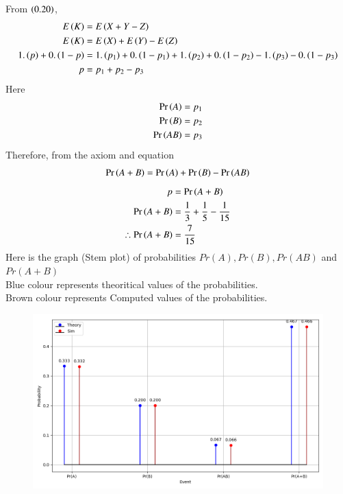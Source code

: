\documentclass[journal]{IEEEtran}
\begin{document}
From $\left(0.20\right)$,
\begin{align}
	E\left(K\right) &= E\left(X + Y - Z\right)\\
	E\left(K\right) &= E\left(X\right) + E\left(Y\right) - E\left(Z\right)\\
	1.\left(p\right) + 0.\left(1 - p\right) &= 1.\left(p_1\right) + 0.\left(1 - p_1\right) + 1.\left(p_2\right) + 0.\left(1 - p_2\right) - 1.\left(p_3\right) - 0.\left(1 - p_3\right)\\
	p &= p_1 + p_2 - p_3
\end{align}
Here
\begin{align}
	\Pr\left(A\right) = p_1\\
	\Pr\left(B\right) = p_2\\
	\Pr\left(AB\right) = p_3
\end{align}
Therefore, from the axiom and equation \\
\begin{align}
	\Pr\left(A + B\right) = \Pr\left(A\right) + \Pr\left(B\right) - \Pr\left(AB\right)
\end{align}
\begin{align}
	p &= \Pr\left(A + B\right)\\
	\Pr\left(A + B\right) &= \frac{1}{3} + \frac{1}{5} - \frac{1}{15}\\
	\therefore \Pr\left(A + B\right) &= \frac{7}{15}
\end{align}
\newpage
Here is the graph (Stem plot) of probabilities $Pr(A),Pr(B),Pr(AB)$ and $Pr(A+B)$\\
Blue colour represents theoritical values of the probabilities.\\
Brown colour represents Computed values of the probabilities.\\
\begin{figure}[h!]
	\centering
	\includegraphics[width=1\columnwidth]{figs/prob.png}
\end{figure}
\end{document}
